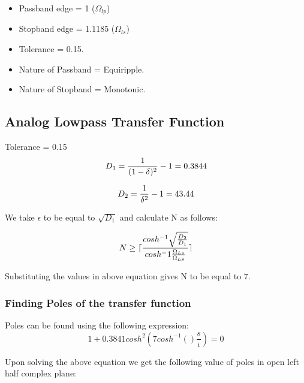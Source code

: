 \documentclass{article}
\begin{document}
\begin{itemize}
    \item Passband edge = 1 ($\Omega_{lp}$)
    \item Stopband edge = 1.1185 ($\Omega_{ls}$)
    \item Tolerance = 0.15.
    \item Nature of Passband = Equiripple.
    \item Nature of Stopband = Monotonic.
\end{itemize}

\subsection{Analog Lowpass Transfer Function}
 Tolerance = 0.15\\

 \begin{equation}
     D_{1} = \frac{1}{(1-\delta)^2} - 1 = 0.3844\\
 \end{equation}

\begin{equation}
    D_{2} = \frac{1}{\delta^2} - 1 = 43.44 \\
\end{equation}

We take $\epsilon$ to be equal to $\sqrt{D_{1}}$ and calculate N as follows:

\begin{equation}
    N \geq \lceil \frac{cosh^{-1}\sqrt{\frac{D_{2}}{D_{1}}}}{cosh^-1\frac{\Omega_{Ls}}{\Omega_{Lp}}} \rceil \\
\end{equation}

Substituting the values in above equation gives N to be equal to $7$.\\

 \subsubsection{Finding Poles of the transfer function}

 Poles can be found using the following expression:\\

 \begin{equation}
     1 + 0.3841cosh^{2}(7cosh^{-1}()\frac{s}{\iota}) = 0
 \end{equation}

 Upon solving the above equation we get the following value of poles in open left half complex plane:\\
\end{document}
